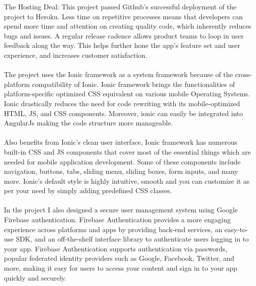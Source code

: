 The Hosting Deal: This project passed Github's successful deployment of the project to Heroku. Less time on repetitive processes means that developers can spend more time and attention on creating quality code, which inherently reduces bugs and issues. A regular release cadence allows product teams to loop in user feedback along the way. This helps further hone the app’s feature set and user experience, and increases customer satisfaction. \\ \\ 
The project uses the Ionic framework as a system framework because of the cross-platform compatibility of Ionic\cite{10}. Ionic framework brings the functionalities of platform-specific optimized CSS equivalent on various mobile Operating Systems. Ionic drastically reduces the need for code rewriting with its mobile-optimized HTML, JS, and CSS components. Moreover, ionic can easily be integrated into AngularJs making the code structure more manageable\cite{8}.\\ \\ Also benefits from Ionic's clean user interface, Ionic framework has numerous built-in CSS and JS components that cover most of the essential things which are needed for mobile application development. Some of these components include navigation, buttons, tabs, sliding menu, sliding boxes, form inputs, and many more. Ionic’s default style is highly intuitive, smooth and you can customize it as per your need by simply adding predefined CSS classes.\\ \\ In the project I also designed a secure user management system using Google Firebase authentication. Firebase Authentication provides a more engaging experience across platforms and apps by providing back-end services, an easy-to-use SDK, and an off-the-shelf interface library to authenticate users logging in to your app. Firebase Authentication supports authentication via passwords, popular federated identity providers such as Google, Facebook, Twitter, and more, making it easy for users to access your content and sign in to your app quickly and securely.
